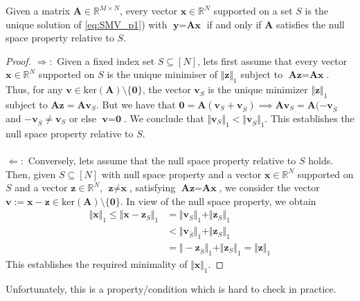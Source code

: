\begin{theorem}
Given a matrix $\textbf{A} \in \mathbb{R}^{M \times N}$, every vector $\textbf{x} \in \mathbb{R}^N$ supported on a set $S$ is the unique solution of \eqref{eq:SMV_p1}) with $\textbf{y} = \textbf{Ax}$ if and only if $\textbf{A}$ satisfies the null space property relative to $S$.
\end{theorem}
\begin{proof}
$\Rightarrow:$ Given a fixed index set $S \subseteq [N]$, lets first assume that every vector $\textbf{x} \in \mathbb{R}^N$ supported on $S$ is the unique minimiser of $\Vert \textbf{z} \Vert_1$ subject to $\textbf{Az} = \textbf{Ax}$. Thus, for any $\textbf{v} \in \text{ker}(\mathbf{A}) \setminus \{\textbf{0} \}$, the vector $\textbf{v}_S$ is the unique minimizer $\Vert \textbf{z} \Vert_1$ subject to $\textbf{Az} = \textbf{Av}_S$. But we have that $\textbf{0} = \textbf{A}(\textbf{v}_S + \textbf{v}_{\overline{S}}) \implies \textbf{Av}_S = \textbf{A}(-\textbf{v}_{\overline{S}}$ and $-\textbf{v}_{\overline{S}} \neq \textbf{v}_S$ or else $\textbf{v} = \textbf{0}$. We conclude that $\Vert \textbf{v}_S \Vert_1 < \Vert \textbf{v}_{\overline{S}} \Vert_1$. This establishes the null space property relative to $S$.
\\ \\
$\Leftarrow:$ Conversely, lets assume that the null space property relative to $S$ holds. Then, given $S \subseteq [N]$ with null space property and a vector $\textbf{x} \in \mathbb{R}^N$ supported on $S$ and a vector $\textbf{z} \in \mathbb{R}^N$, $\textbf{z} \neq \textbf{x}$, satisfying $\textbf{Az} = \textbf{Ax}$, we consider the vector $\textbf{v} := \textbf{x} - \textbf{z} \in \text{ker}(\textbf{A}) \setminus \{ \textbf{0} \}$. In view of the null space property, we obtain
\begin{align*}
\Vert \textbf{x} \Vert_1 \leq \Vert \textbf{x} - \textbf{z}_S \Vert_1 &= \Vert \textbf{v}_S \Vert_1 + \Vert \textbf{z}_S \Vert_1 \\
&< \Vert \textbf{v}_{\overline{S}} \Vert_1 + \Vert \textbf{z}_S \Vert_1 \\
&= \Vert -\textbf{z}_{\overline{S}} \Vert_1 + \Vert \textbf{z}_S \Vert_1 = \Vert \textbf{z} \Vert_1
\end{align*}
This establishes the required minimality of $\Vert \textbf{x} \Vert_1$.
\end{proof}
Unfortunately, this is a property/condition which is hard to check in practice.

